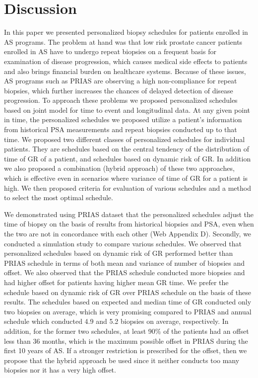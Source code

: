 
\section{Discussion}
\label{sec: discussion}
In this paper we presented personalized biopsy schedules for patients enrolled in AS programs. The problem at hand was that low risk prostate cancer patients enrolled in AS have to undergo repeat biopsies on a frequent basis for examination of disease progression, which causes medical side effects to patients and also brings financial burden on healthcare systems. Because of these issues, AS programs such as PRIAS are observing a high non-compliance for repeat biopsies, which further increases the chances of delayed detection of disease progression. To approach these problems we proposed personalized schedules based on joint model for time to event and longitudinal data. At any given point in time, the personalized schedules we proposed utilize a patient's information from historical PSA measurements and repeat biopsies conducted up to that time. We proposed two different classes of personalized schedules for individual patients. They are schedules based on the central tendency of the distribution of time of GR of a patient, and schedules based on dynamic risk of GR. In addition we also proposed a combination (hybrid approach) of these two approaches, which is effective even in scenarios where variance of time of GR for a patient is high. We then proposed criteria for evaluation of various schedules and a method to select the most optimal schedule.

We demonstrated using PRIAS dataset that the personalized schedules adjust the time of biopsy on the basis of results from historical biopsies and PSA, even when the two are not in concordance with each other (Web Appendix D). Secondly, we conducted a simulation study to compare various schedules. We observed that personalized schedules based on dynamic risk of GR performed better than PRIAS schedule in terms of both mean and variance of number of biopsies and offset. We also observed that the PRIAS schedule conducted more biopsies and had higher offset for patients having higher mean GR time. We prefer the schedule based on dynamic risk of GR over PRIAS schedule on the basis of these results. The schedules based on expected and median time of GR conducted only two biopsies on average, which is very promising compared to PRIAS and annual schedule which conducted 4.9 and 5.2 biopsies on average, respectively. In addition, for the former two schedules, at least 90\% of the patients had an offset less than 36 months, which is the maximum possible offset in PRIAS during the first 10 years of AS. If a stronger restriction is prescribed for the offset, then we propose that the hybrid approach be used since it neither conducts too many biopsies nor it has a very high offset.

